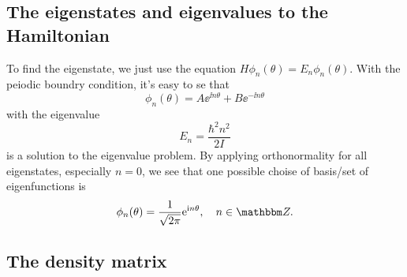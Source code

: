 \documentclass[11pt,letter, swedish, english
]{article}
\begin{document}
\subsection{The eigenstates and eigenvalues to the Hamiltonian}
To find the eigenstate, we just use the equation
$H\phi_n(\theta)=E_n\phi_n(\theta)$. With the peiodic boundry
condition, it's easy to se that
\begin{equation}
\phi_n(\theta)= A\ee^{\ii n\theta}+B\ee^{-\ii n\theta}
\end{equation}
with the eigenvalue
\begin{equation}
E_n=\frac{\hbar^2n^2}{2I}
\end{equation}
is a solution to the eigenvalue problem. By applying orthonormality
for all eigenstates, especially $n=0$, we see that one possible choise
of basis/set of eigenfunctions is
\begin{equation}
\phi_n(\theta)=\frac{1}{\sqrt{2\pi}}\ee^{\ii n\theta}\qcomma n\in\Z.
\end{equation}


\subsection{The density matrix}
\end{document}
